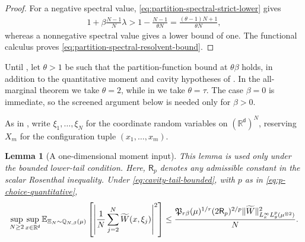 \documentclass[11pt,reqno]{amsart}
\numberwithin{equation}{section}
\theoremstyle{plain}
\newtheorem{lemma}[lemma]{Lemma}
\theoremstyle{remark}
\DeclarePairedDelimiter{\norm}{\lVert}{\rVert}
\renewcommand{\d}{\mathsf{d}}
\newcommand{\R}{{\mathbb{R}}}
\newcommand{\E}{{\mathbb{E}}}
\newcommand{\Q}{{\mathbb{Q}}}
\newcommand{\tl}{\widetilde}
\newcommand{\be}{\beta}
\begin{document}
\begin{proof}
For a negative spectral value, \eqref{eq:partition-spectral-strict-lower} gives
\begin{align}\label{eq:spectral-finite-N-lower}
 1+\be\frac{N-1}{N}\lambda
 >1-\frac{N-1}{\theta N}
 =\frac{(\theta-1)N+1}{\theta N},
\end{align}
whereas a nonnegative spectral value gives a lower bound of one.  The functional calculus proves \eqref{eq:partition-spectral-resolvent-bound}.
\end{proof}

Until , let \(\theta>1\) be such that the partition-function bound at \(\theta\be\) holds, in addition to the quantitative moment and cavity hypotheses of .
  In the all-marginal theorem we take \(\theta=2\), while in  we take \(\theta=\tau\).  The case \(\be=0\) is immediate, so the screened argument below is needed only for \(\be>0\).

\noindent As in , write \(\xi_1,\ldots,\xi_N\) for the coordinate random variables on \((\R^\d)^N\), reserving \(X_m\) for the configuration tuple \((x_1,\ldots,x_m)\).

\begin{lemma}[A one-dimensional moment input]\label{lem:fixed-x-moment}
This lemma is used only under the bounded lower-tail condition.  Here, \(\mathsf R_p\) denotes any admissible constant in the scalar Rosenthal inequality.  Under \eqref{eq:cavity-tail-bounded}, with \(p\) as in \eqref{eq:p-choice-quantitative},
\begin{align}\label{eq:centered-sum-Q-second}
 \sup_{N\ge2}\sup_{x\in\R^\d}
 \E_{\Xi_N\sim \Q_{N,\be}(\mu)}\left[\left|\frac1N\sum_{j=2}^N \tl W(x,\xi_j)\right|^2\right]
 \le
 \frac{\mathfrak P_{r\be}(\mu)^{1/r}(2\mathsf R_p)^{2/p}
 \norm{\tl W}_{L_x^\infty L_y^p(\mu^{\otimes2})}^2}{N}.
\end{align}
\end{lemma}
\end{document}
